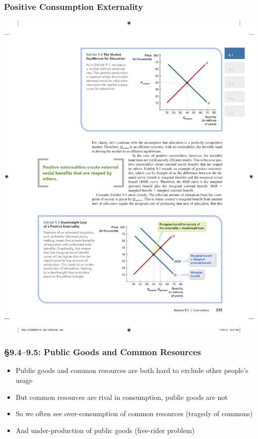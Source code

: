 \documentclass[12pt, xcolor=dvipsnames]{beamer}
\begin{document}
\begin{frame}
\frametitle{\bf Positive Consumption Externality}
\begin{center}
\includegraphics[height=.85\textheight]{figures/6.pdf}
\end{center}
\end{frame}

\begin{frame}
\frametitle{\large \bf §9.4--9.5: Public Goods and Common Resources}
\begin{itemize}
\item Public goods and common resources are both hard to exclude other people's usage
\item But common resources are rival in consumption, public goods are not
\item So we often see over-consumption of common resources (tragedy of commons)
\item And under-production of public goods (free-rider problem)
\end{itemize}
\end{frame}
\end{document}
